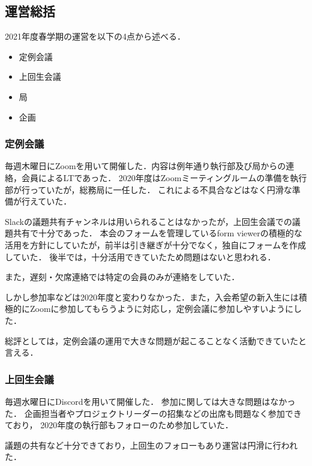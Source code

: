 \subsection*{運営総括}


2021年度春学期の運営を以下の4点から述べる．
\begin{itemize}
    \item 定例会議
    \item 上回生会議
    \item 局
    \item 企画
\end{itemize}

\subsubsection*{定例会議}
毎週木曜日にZoomを用いて開催した．内容は例年通り執行部及び局からの連絡，会員によるLTであった．
2020年度はZoomミーティングルームの準備を執行部が行っていたが，総務局に一任した．
これによる不具合などはなく円滑な準備が行えていた．

Slackの議題共有チャンネルは用いられることはなかったが，上回生会議での議題共有で十分であった．
本会のフォームを管理しているform viewerの積極的な活用を方針にしていたが，前半は引き継ぎが十分でなく，独自にフォームを作成していた．
後半では，十分活用できていたため問題はないと思われる．

また，遅刻・欠席連絡では特定の会員のみが連絡をしていた．

しかし参加率などは2020年度と変わりなかった．また，入会希望の新入生には積極的にZoomに参加してもらうように対応し，定例会議に参加しやすいようにした．

総評としては，定例会議の運用で大きな問題が起こることなく活動できていたと言える．

\subsubsection*{上回生会議}
毎週水曜日にDiscordを用いて開催した．
参加に関しては大きな問題はなかった．
企画担当者やプロジェクトリーダーの招集などの出席も問題なく参加できており，
2020年度の執行部もフォローのため参加していた．

議題の共有など十分できており，上回生のフォローもあり運営は円滑に行われた．

